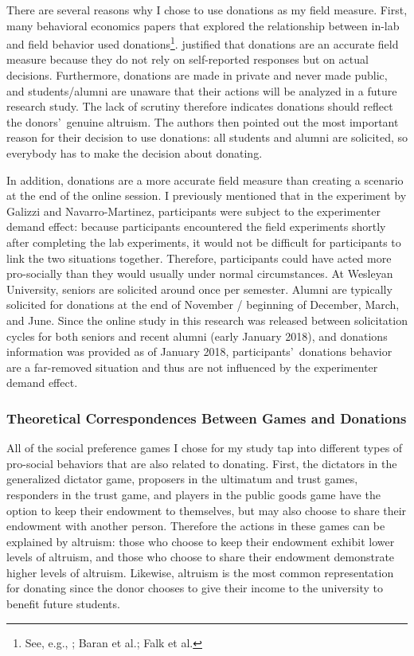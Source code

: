 \documentclass[12pt]{article}
\begin{document}
There are several reasons why I chose to use donations as my field measure. First, many behavioral economics papers that explored the relationship between in-lab and field behavior used donations\footnote{See, e.g., \cite{benz_meier_2006}; Baran et al.; Falk et al.}. \cite{falk_2013} justified that donations are an accurate field measure because they do not rely on self-reported responses but on actual decisions. Furthermore, donations are made in private and never made public, and students/alumni are unaware that their actions will be analyzed in a future research study. The lack of scrutiny therefore indicates donations should reflect the donors\rq \ genuine altruism. The authors then pointed out the most important reason for their decision to use donations: all students and alumni are solicited, so everybody has to make the decision about donating.

In addition, donations are a more accurate field measure than creating a scenario at the end of the online session. I previously mentioned that in the experiment by Galizzi and Navarro-Martinez, participants were subject to the experimenter demand effect: because participants encountered the field experiments shortly after completing the lab experiments, it would not be difficult for participants to link the two situations together. Therefore, participants could have acted more pro-socially than they would usually under normal circumstances. At Wesleyan University, seniors are solicited around once per semester. Alumni are typically solicited for donations at the end of November / beginning of December, March, and June. Since the online study in this research was released between solicitation cycles for both seniors and recent alumni (early January 2018), and donations information was provided as of January 2018, participants\rq \ donations behavior are a far-removed situation and thus are not influenced by the experimenter demand effect.


\subsubsection{Theoretical Correspondences Between Games and Donations}

All of the social preference games I chose for my study tap into different types of pro-social behaviors that are also related to donating. First, the dictators in the generalized dictator game, proposers in the ultimatum and trust games, responders in the trust game, and players in the public goods game have the option to keep their endowment to themselves, but may also choose to share their endowment with another person. Therefore the actions in these games can be explained by altruism: those who choose to keep their endowment exhibit lower levels of altruism, and those who choose to share their endowment demonstrate higher levels of altruism. Likewise, altruism is the most common representation for donating since the donor chooses to give their income to the university to benefit future students. 
\end{document}
